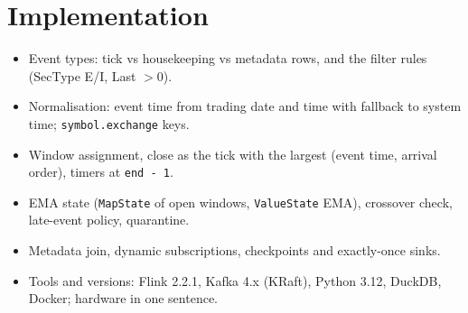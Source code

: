 \section{Implementation}
\label{sec:implementation}

\begin{itemize}
  \item Event types: tick vs housekeeping vs metadata rows, and the filter rules (SecType E/I, Last $>0$).
  \item Normalisation: event time from trading date and time with fallback to system time; \texttt{symbol.exchange} keys.
  \item Window assignment, close as the tick with the largest (event time, arrival order), timers at \texttt{end - 1}.
  \item EMA state (\texttt{MapState} of open windows, \texttt{ValueState} EMA), crossover check, late-event policy, quarantine.
  \item Metadata join, dynamic subscriptions, checkpoints and exactly-once sinks.
  \item Tools and versions: Flink 2.2.1, Kafka 4.x (KRaft), Python 3.12, DuckDB, Docker; hardware in one sentence.
\end{itemize}



